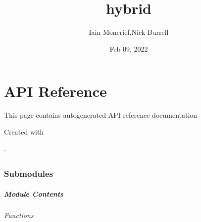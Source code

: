 \documentclass[letterpaper,10pt,english]{sphinxmanual}
\title{hybrid}
\date{Feb 09, 2022}
\author{Iain Moncrief,Nick Burrell}
\begin{document}
\pagestyle{empty}
\sphinxmaketitle
\pagestyle{plain}
\sphinxtableofcontents
\pagestyle{normal}
\label{\detokenize{index::doc}}



\chapter{API Reference}
\label{\detokenize{autoapi/index:api-reference}}\label{\detokenize{autoapi/index::doc}}
\sphinxAtStartPar
This page contains auto\sphinxhyphen{}generated API reference documentation %
\begin{footnote}[1]\sphinxAtStartFootnote
Created with 
%
\end{footnote}.


\section{}
\label{\detokenize{autoapi/hybrid/index:module-hybrid}}\label{\detokenize{autoapi/hybrid/index:hybrid}}\label{\detokenize{autoapi/hybrid/index::doc}}

\subsection{Submodules}
\label{\detokenize{autoapi/hybrid/index:submodules}}

\subsubsection{}
\label{\detokenize{autoapi/hybrid/language/index:module-hybrid.language}}\label{\detokenize{autoapi/hybrid/language/index:hybrid-language}}\label{\detokenize{autoapi/hybrid/language/index::doc}}

\paragraph{Module Contents}
\label{\detokenize{autoapi/hybrid/language/index:module-contents}}

\subparagraph{Functions}
\label{\detokenize{autoapi/hybrid/language/index:functions}}
\end{document}

